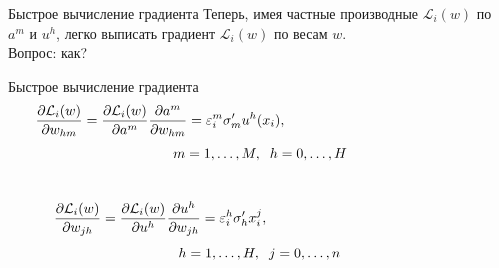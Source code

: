 \documentclass[10pt]{beamer}
\begin{document}
\begin{frame}{Быстрое вычисление градиента}
	Теперь, имея частные производные $\mathcal{L}_i(w)$ по $a^m$ и $u^h$, легко выписать градиент $\mathcal{L}_i(w)$ по весам $w$.\\
	\bigbreak
	\pause
	\alert{Вопрос}: как?
\end{frame}

\begin{frame}{Быстрое вычисление градиента}
	$$\frac {\partial \mathcal{L}_i(w)}{\partial w_{hm}} = \frac {\partial \mathcal{L}_i(w)}{\partial a^m} \frac {\partial a^m}{\partial w_{hm}} = \varepsilon^m_i \sigma'_m u^h(x_i), \hspace{50mm}$$ $$m = 1,\dots,M, \hspace{2mm} h = 0,\dots, H$$\\
	\bigbreak
	\pause
	$$\frac {\partial \mathcal{L}_i(w)}{\partial w_{jh}} = \frac {\partial \mathcal{L}_i(w)}{\partial u^h} \frac {\partial u^h}{\partial w_{jh}} = \varepsilon_i^h \sigma'_h x_i^j, \hspace{50mm}$$ $$h = 1,\dots,H, \hspace{2mm} j = 0,\dots, n$$ \\
\end{frame}
\end{document}
